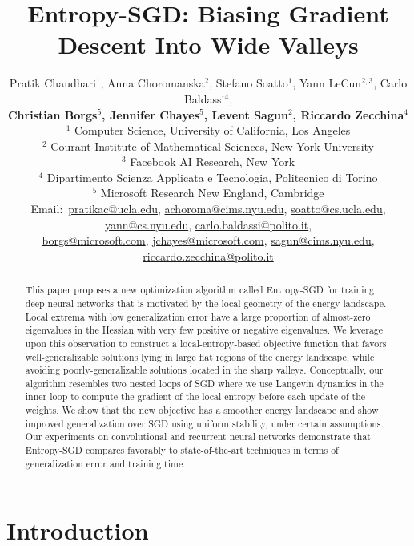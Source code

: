\documentclass[10pt]{article}
\title{Entropy-SGD: Biasing Gradient Descent Into Wide Valleys}
\author{Pratik Chaudhari$^{1}$, Anna Choromanska$^{2}$, Stefano Soatto$^{1}$, Yann LeCun$^{2,3}$, Carlo Baldassi$^{4}$,\\[0.03in]
\textbf{Christian Borgs$^{5}$, Jennifer Chayes$^{5}$, 
Levent Sagun$^{2}$, 
Riccardo Zecchina$^{4}$}\\[0.05in]
$^{1}$ Computer Science, University of California, Los Angeles\\
$^{2}$ Courant Institute of Mathematical Sciences, New York University\\
$^{3}$ Facebook AI Research, New York\\
$^{4}$ Dipartimento Scienza Applicata e Tecnologia, Politecnico di Torino\\
$^{5}$ Microsoft Research New England, Cambridge\\ [0.05in]
{\footnotesize
Email:\ \href{mailto:pratikac@ucla.edu}{pratikac@ucla.edu},
\href{mailto:achoroma@cims.nyu.edu}{achoroma@cims.nyu.edu},
\href{mailto:soatto@cs.ucla.edu}{soatto@cs.ucla.edu},
\href{mailto:yann@cs.nyu.edu}{yann@cs.nyu.edu},
\href{mailto:carlo.baldassi@polito.it}{carlo.baldassi@polito.it},}\\[0.03in]
{\footnotesize
\hspace{0.33in} \href{mailto:borgs@microsoft.com}{borgs@microsoft.com},
\href{mailto:jchayes@microsoft.com}{jchayes@microsoft.com},
\href{mailto:sagun@cims.nyu.edu}{sagun@cims.nyu.edu},
\href{mailto:riccardo.zecchina@polito.it}{riccardo.zecchina@polito.it}
}}
\newcommand{\todo}[1]{{\color{gray}#1}\marginpar{\tiny\noindent{\raggedright{\color{blue}[TODO]}}}}
\renewcommand{\todo}[1]{#1}
\begin{document}
\maketitle

\begin{abstract}
This paper proposes a new optimization algorithm called Entropy-SGD for training deep neural networks that is motivated by the local geometry of the energy landscape. Local extrema with low generalization error have a large proportion of almost-zero eigenvalues in the Hessian with very few positive or negative eigenvalues. We leverage upon this observation to construct a local-entropy-based objective function that favors well-generalizable solutions lying in large flat regions of the energy landscape, while avoiding poorly-generalizable solutions located in the sharp valleys. Conceptually, our algorithm resembles two nested loops of SGD where we use Langevin dynamics in the inner loop to compute the gradient of the local entropy before each update of the weights. We show that the new objective has a smoother energy landscape and show improved generalization over SGD using uniform stability, under certain assumptions. Our experiments on convolutional and recurrent neural networks demonstrate that Entropy-SGD compares favorably to state-of-the-art techniques in terms of generalization error and training time.
\end{abstract}

\section{Introduction}
\label{s:intro}

\end{document}
